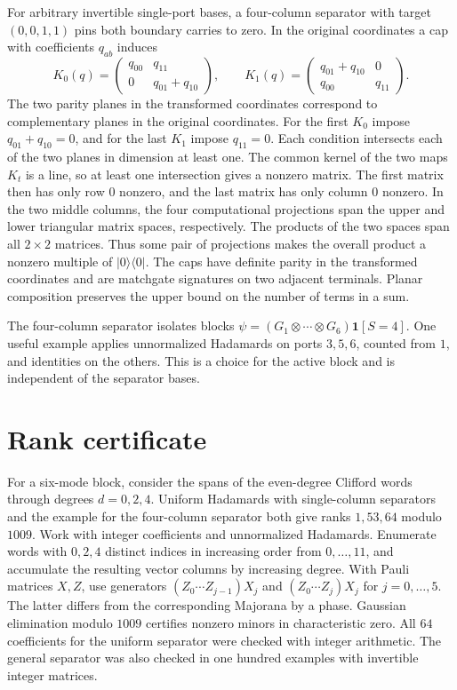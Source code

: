 \documentclass[11pt,a4paper]{article}
\numberwithin{equation}{section}
\begin{document}
For arbitrary invertible single-port bases, a four-column separator with target \((0,0,1,1)\) pins both boundary carries to zero. In the original coordinates a cap with coefficients \(q_{ab}\) induces
\begin{equation}\label{eq:carry-matrices}
K_0(q)=\begin{pmatrix}q_{00}&q_{11}\\0&q_{01}+q_{10}\end{pmatrix},
\qquad
K_1(q)=\begin{pmatrix}q_{01}+q_{10}&0\\q_{00}&q_{11}\end{pmatrix}.
\end{equation}
The two parity planes in the transformed coordinates correspond to complementary planes in the original coordinates. For the first \(K_0\) impose \(q_{01}+q_{10}=0\), and for the last \(K_1\) impose \(q_{11}=0\). Each condition intersects each of the two planes in dimension at least one. The common kernel of the two maps \(K_t\) is a line, so at least one intersection gives a nonzero matrix. The first matrix then has only row \(0\) nonzero, and the last matrix has only column \(0\) nonzero. In the two middle columns, the four computational projections span the upper and lower triangular matrix spaces, respectively. The products of the two spaces span all \(2\times2\) matrices. Thus some pair of projections makes the overall product a nonzero multiple of \(|0\rangle\langle0|\). The caps have definite parity in the transformed coordinates and are matchgate signatures on two adjacent terminals. Planar composition preserves the upper bound on the number of terms in a sum.

The four-column separator isolates blocks \(\psi=(G_1\otimes\cdots\otimes G_6)\mathbf 1[S=4]\). One useful example applies unnormalized Hadamards on ports \(3,5,6\), counted from \(1\), and identities on the others. This is a choice for the active block and is independent of the separator bases.

\section{Rank certificate}\label{rank-certificate}

For a six-mode block, consider the spans of the even-degree Clifford words through degrees \(d=0,2,4\). Uniform Hadamards with single-column separators and the example for the four-column separator both give ranks \(1,53,64\) modulo \(1009\). Work with integer coefficients and unnormalized Hadamards. Enumerate words with \(0,2,4\) distinct indices in increasing order from \(0,\dots,11\), and accumulate the resulting vector columns by increasing degree. With Pauli matrices \(X,Z\), use generators \((Z_0\cdots Z_{j-1})X_j\) and \((Z_0\cdots Z_j)X_j\) for \(j=0,\dots,5\). The latter differs from the corresponding Majorana by a phase. Gaussian elimination modulo \(1009\) certifies nonzero minors in characteristic zero. All \(64\) coefficients for the uniform separator were checked with integer arithmetic. The general separator was also checked in one hundred examples with invertible integer matrices.
\end{document}
